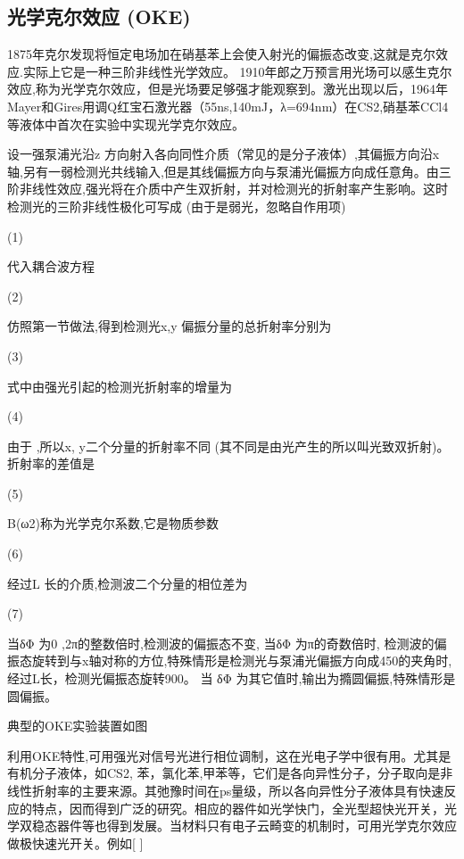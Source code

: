 \subsection{光学克尔效应 (OKE)}
1875年克尔发现将恒定电场加在硝基苯上会使入射光的偏振态改变,这就是克尔效应.实际上它是一种三阶非线性光学效应。 1910年郎之万预言用光场可以感生克尔效应,称为光学克尔效应，但是光场要足够强才能观察到。激光出现以后，1964年Mayer和Gires用调Q红宝石激光器（55ns,140mJ，λ=694nm）在CS2,硝基苯CCl4等液体中首次在实验中实现光学克尔效应。

设一强泵浦光沿z 方向射入各向同性介质（常见的是分子液体）,其偏振方向沿x 轴,另有一弱检测光共线输入,但是其线偏振方向与泵浦光偏振方向成任意角。由三阶非线性效应,强光将在介质中产生双折射，并对检测光的折射率产生影响。这时检测光的三阶非线性极化可写成 (由于是弱光，忽略自作用项)

                 (1)

代入耦合波方程

                 (2)

仿照第一节做法,得到检测光x,y 偏振分量的总折射率分别为

                                            (3)

式中由强光引起的检测光折射率的增量为

                    (4)

由于 ,所以x, y二个分量的折射率不同 (其不同是由光产生的所以叫光致双折射)。折射率的差值是                            

(5)

B(ω2)称为光学克尔系数,它是物质参数

                          (6)

经过L 长的介质,检测波二个分量的相位差为

                                       (7)

当δΦ 为0 ,2π的整数倍时,检测波的偏振态不变, 当δΦ 为π的奇数倍时, 检测波的偏振态旋转到与x轴对称的方位,特殊情形是检测光与泵浦光偏振方向成450的夹角时, 经过L长，检测光偏振态旋转900。 当 δΦ 为其它值时,输出为撱圆偏振,特殊情形是圆偏振。

典型的OKE实验装置如图 
           
利用OKE特性,可用强光对信号光进行相位调制，这在光电子学中很有用。尤其是有机分子液体，如CS2, 苯，氯化苯,甲苯等，它们是各向异性分子，分子取向是非线性折射率的主要来源。其弛豫时间在ps量级，所以各向异性分子液体具有快速反应的特点，因而得到广泛的研究。相应的器件如光学快门，全光型超快光开关，光学双稳态器件等也得到发展。当材料只有电子云畸变的机制时，可用光学克尔效应做极快速光开关。例如[ ]

